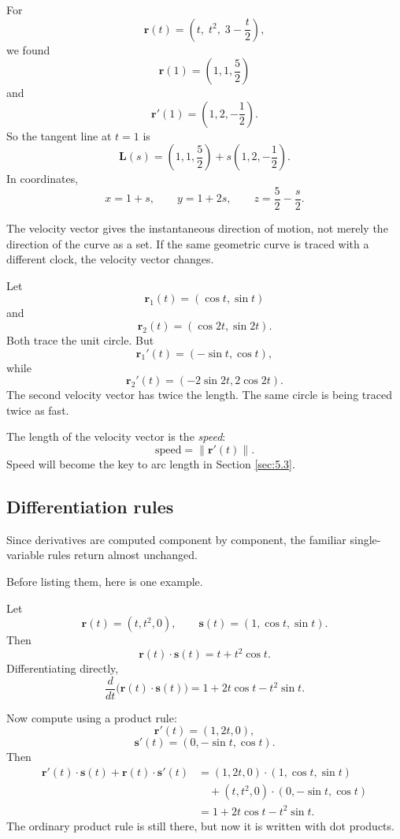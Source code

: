 \begin{example}
For
\[
    \mathbf r(t)=\left(t,\;t^2,\;3-\frac{t}{2}\right),
\]
we found
\[
    \mathbf r(1)=\left(1,1,\frac52\right)
\]
and
\[
    \mathbf r'(1)=\left(1,2,-\frac12\right).
\]
So the tangent line at \(t=1\) is
\[
    \mathbf L(s)
    =
    \left(1,1,\frac52\right)
    +
    s\left(1,2,-\frac12\right).
\]
In coordinates,
\[
    x=1+s,\qquad
    y=1+2s,\qquad
    z=\frac52-\frac{s}{2}.
\]
\end{example}

The velocity vector gives the instantaneous direction of motion, not merely the
direction of the curve as a set.  If the same geometric curve is traced with a different
clock, the velocity vector changes.

\begin{example}
Let
\[
    \mathbf r_1(t)=(\cos t,\sin t)
\]
and
\[
    \mathbf r_2(t)=(\cos 2t,\sin 2t).
\]
Both trace the unit circle.  But
\[
    \mathbf r_1'(t)=(-\sin t,\cos t),
\]
while
\[
    \mathbf r_2'(t)=(-2\sin 2t,2\cos 2t).
\]
The second velocity vector has twice the length.  The same circle is being traced twice
as fast.
\end{example}

The length of the velocity vector is the \emph{speed}:
\[
    \text{speed}=\|\mathbf r'(t)\|.
\]
Speed will become the key to arc length in Section \ref{sec:5.3}.

\subsection{Differentiation rules}

Since derivatives are computed component by component, the familiar single-variable
rules return almost unchanged.

Before listing them, here is one example.

\begin{example}
Let
\[
    \mathbf r(t)=(t,t^2,0),
    \qquad
    \mathbf s(t)=(1,\cos t,\sin t).
\]
Then
\[
    \mathbf r(t)\cdot\mathbf s(t)
    =
    t+t^2\cos t.
\]
Differentiating directly,
\[
    \frac{d}{dt}\bigl(\mathbf r(t)\cdot\mathbf s(t)\bigr)
    =
    1+2t\cos t-t^2\sin t.
\]

Now compute using a product rule:
\[
    \mathbf r'(t)=(1,2t,0),
\]
\[
    \mathbf s'(t)=(0,-\sin t,\cos t).
\]
Then
\[
\begin{aligned}
\mathbf r'(t)\cdot\mathbf s(t)+\mathbf r(t)\cdot\mathbf s'(t)
&=
(1,2t,0)\cdot(1,\cos t,\sin t)\\
&\quad +(t,t^2,0)\cdot(0,-\sin t,\cos t)\\
&=
1+2t\cos t-t^2\sin t.
\end{aligned}
\]
The ordinary product rule is still there, but now it is written with dot products.
\end{example}

